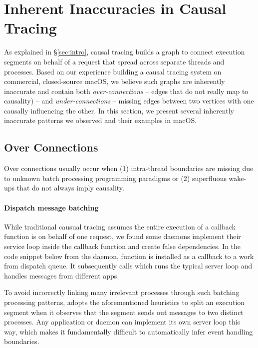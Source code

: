 \section{Inherent Inaccuracies in Causal Tracing}\label{sec:inaccuracy}

As explained in \S\ref{sec:intro}, causal tracing builds a graph to
connect execution segments on behalf of a request that spread across
separate threads and processes.  Based on our experience building a causal
tracing system on commercial, closed-source macOS, we believe such graphs
are inherently inaccurate and contain both \emph{over-connections} --
edges that do not really map to causality) -- and \emph{under-connections}
-- missing edges between two vertices with one causally influencing the
other.  In this section, we present several inherently inaccurate patterns
we observed and their examples in macOS.


\subsection{Over Connections}%
Over connections usually occur when (1) intra-thread boundaries are
missing due to unknown batch processing programming paradigms or (2)
superfluous wake-ups that do not always imply causality.

\paragraph{Dispatch message batching}

While traditional causual tracing assumes the entire execution of a callback
function is on behalf of one request, we found some daemons implement their
service loop inside the callback function and create false dependencies. In the
code snippet below from the  daemon, function 
is installed as a callback to a work from dispatch queue. It subsequently calls
 which runs the typical server loop and handles
messages from different apps.

To avoid incorrectly linking many irrelevant processes through such batching
processing patterns, \xxx adopts the aforementioned heuristics to split an
execution segment when it observes that the segment sends out messages to two
distinct processes. Any application or daemon can implement its own server loop
this way, which makes it fundamentally difficult to automatically infer event
handling boundaries.

